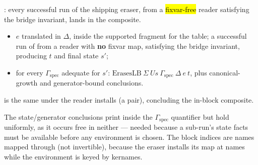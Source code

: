 \begin{definition}
\label{def:VisitExprRefinesLB}
\leanok
{}
 : every successful run of the shipping eraser, from a
\hl{fixvar-free} reader satisfying the bridge invariant, lands in the composite.
\begin{itemize}
\item {} $e$ translated in $\Delta$, inside the supported fragment for the table; a successful
run of  from a reader with \textbf{no} fixvar map, satisfying the bridge invariant,
producing $t$ and final state $s'$;
\item {} for every $\Gamma_{\mathrm{spec}}$ adequate for $s'$: $\mathrm{ErasesLB}\ \Sigma\ Us\
\Gamma_{\mathrm{spec}}\ \Delta\ e\ t$, plus canonical-growth and generator-bound conclusions.
\end{itemize}
  is the same under the reader  installs (a
\code{BlockKeyed} pair), concluding the in-block composite.
\end{definition}

\begin{remark}
 The state/generator conclusions print inside the $\Gamma_{\mathrm{spec}}$ quantifier but hold
uniformly, as it occurs free in neither --- needed because a sub-run's state facts must be available
before any environment is chosen. The block indices are names mapped through \code{toKername} (not
invertible), because the eraser installs its map at names while the environment is keyed by kernames.
\end{remark}

